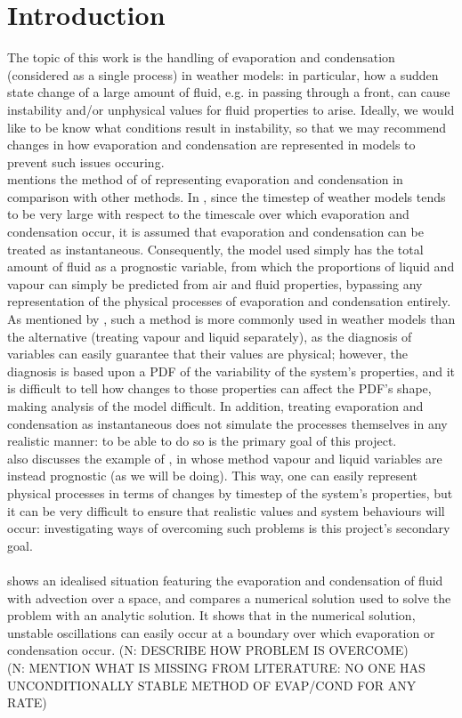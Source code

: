 \documentclass[11pt]{article}
\begin{document}
\section{Introduction}
The topic of this work is the handling of evaporation and condensation (considered as a single process) in weather models: in particular, how a sudden state change of a large amount of fluid, e.g. in passing through a front, can cause instability and/or unphysical values for fluid properties to arise. Ideally, we would like to be know what conditions result in instability, so that we may recommend changes in how evaporation and condensation are represented in models to prevent such issues occuring.
~\\
\citet[p.~2095]{Wilson2008} mentions the method of \citet{Smith1990} of representing evaporation and condensation in comparison with other methods. In \citeauthor{Smith1990}, since the timestep of weather models tends to be very large with respect to the timescale over which evaporation and condensation occur, it is assumed that evaporation and condensation can be treated as instantaneous. Consequently, the model used simply has the total amount of fluid as a prognostic variable, from which the proportions of liquid and vapour can simply be predicted from air and fluid properties, bypassing any representation of the physical processes of evaporation and condensation entirely.
As mentioned by \citeauthor{Wilson2008}, such a method is more commonly used in weather models than the alternative (treating vapour and liquid separately), as the diagnosis of variables can easily guarantee that their values are physical; however, the diagnosis is based upon a PDF of the variability of the system's properties, and it is difficult to tell how changes to those properties can affect the PDF's shape, making analysis of the model difficult. In addition, treating evaporation and condensation as instantaneous does not simulate the processes themselves in any realistic manner: to be able to do so is the primary goal of this project. \\
\citeauthor{Wilson2008} also discusses the example of \citet{Tiedtke1993}, in whose method vapour and liquid variables are instead prognostic (as we will be doing). This way, one can easily represent physical processes in terms of changes by timestep of the system's properties, but it can be very difficult to ensure that realistic values and system behaviours will occur: investigating ways of overcoming such problems is this project's secondary goal. \\
~\\
\citet{GS1990} shows an idealised situation featuring the evaporation and condensation of fluid with advection over a space, and compares a numerical solution used to solve the problem with an analytic solution. It shows that in the numerical solution, unstable oscillations can easily occur at a boundary over which evaporation or condensation occur. (N: DESCRIBE HOW PROBLEM IS OVERCOME) \\
(N: MENTION WHAT IS MISSING FROM LITERATURE: NO ONE HAS UNCONDITIONALLY STABLE METHOD OF EVAP/COND FOR ANY RATE)
\end{document}
